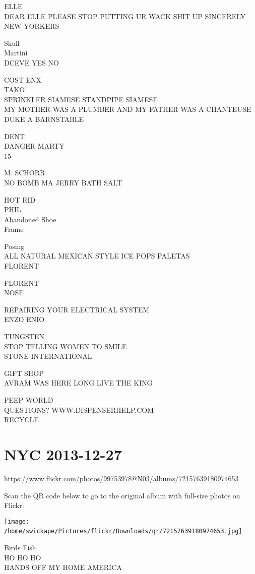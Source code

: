\documentclass[10pt,letterpaper]{article}
\begin{document}
ELLE\\
DEAR ELLE PLEASE STOP PUTTING UR WACK SHIT UP SINCERELY NEW YORKERS

Skull\\
Martini\\
DCEVE YES NO

COST ENX\\
TAKO\\
SPRINKLER SIAMESE STANDPIPE SIAMESE\\
MY MOTHER WAS A PLUMBER AND MY FATHER WAS A CHANTEUSE DUKE A BARNSTABLE

DENT\\
DANGER MARTY\\
15

M. SCHORR\\
NO BOMB MA JERRY BATH SALT

HOT RID\\
PHIL\\
Abandoned Shoe\\
Frame

Posing\\
ALL NATURAL MEXICAN STYLE ICE POPS PALETAS\\
FLORENT

FLORENT\\
NOSE

REPAIRING YOUR ELECTRICAL SYSTEM\\
ENZO ENIO

TUNGSTEN\\
STOP TELLING WOMEN TO SMILE\\
STONE INTERNATIONAL

GIFT SHOP\\
AVRAM WAS HERE LONG LIVE THE KING

PEEP WORLD\\
QUESTIONS?  WWW.DISPENSERHELP.COM\\
RECYCLE
\

\section*{NYC 2013-12-27}

\url{https://www.flickr.com/photos/99753978@N03/albums/72157639180974653}

Scan the QR code below to go to the original album with full-size photos on Flickr:

\texttt{[image: /home/swickape/Pictures/flickr/Downloads/qr/72157639180974653.jpg]}
\

Birds Fish\\
HO HO HO\\
HANDS OFF MY HOME AMERICA
\end{document}
